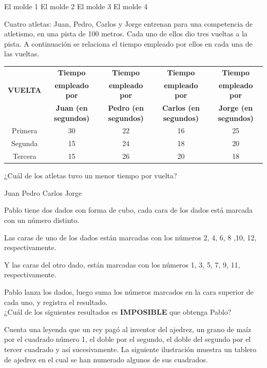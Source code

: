 \documentclass[10pt,letterpaper,addpoints]{exam}
\begin{document}
\begin{questions}
\begin{oneparchoices}
\choice El molde 1
\choice El molde 2
\CorrectChoice El molde 3
\choice El molde 4
\end{oneparchoices}
\question Cuatro atletas: Juan, Pedro, Carlos y Jorge entrenan para una competencia de atletismo, en una pista de 100 metros. Cada uno de ellos dio tres vueltas a la pista. A continuación
se relaciona el tiempo empleado por ellos en cada una de las vueltas.
\begin{center}
\begin{tabular}{|c|c|c|c|c|}
\hline 
 & \textbf{Tiempo} & \textbf{Tiempo} & \textbf{Tiempo} & \textbf{Tiempo} \\ 
\textbf{VUELTA} & \textbf{empleado por} & \textbf{empleado por} & \textbf{empleado por} & \textbf{empleado por} \\ 
 & \textbf{Juan (en segundos)} & \textbf{Pedro (en segundos)} & \textbf{Carlos (en segundos)} & \textbf{Jorge (en segundos)} \\ 
\hline 
Primera & 30 & 22 & 16 & 25 \\ 
\hline 
Segunda & 15 & 24 & 18 & 20 \\ 
\hline 
Tercera & 15 & 26 & 20 & 18 \\ 
\hline 
\end{tabular} 
\end{center}
¿Cuál de los atletas tuvo un menor tiempo por vuelta?
 
\begin{oneparchoices}
\choice Juan
\choice Pedro
\CorrectChoice Carlos
\choice Jorge
\end{oneparchoices}
\question Pablo tiene dos dados con forma de cubo, cada cara de los dados está marcada con un número distinto.

Las caras de uno de los dados están marcadas con los números 2, 4, 6, 8 ,10, 12, respectivamente.

Y las caras del otro dado, están marcadas con los números 1, 3, 5, 7, 9, 11, respectivamente.

Pablo lanza los dados, luego suma los números marcados en la cara superior de cada uno, y registra el resultado.
\\
¿Cuál de los siguientes resultados es \textbf{IMPOSIBLE} que obtenga Pablo?

\begin{oneparchoices}
\end{oneparchoices}

\begin{minipage}{.5\textwidth}
\question Cuenta una leyenda que un rey pagó al inventor del ajedrez, un grano de maíz por el cuadrado número 1, el doble por el segundo, el doble del segundo por el tercer cuadrado y así sucesivamente. La siguiente ilustración muestra un tablero de ajedrez en el cual se han numerado algunos de sus cuadrados.\\


\end{minipage}
\end{questions}
\end{document}
